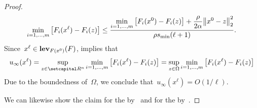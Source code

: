 \documentclass[../../main]{subfiles}
\begin{document}
\begin{proof}
\begin{equation}
        \min_{i = 1, \dots, m} \left[ F_i(x^\ell) - F_i(z) \right] \le \frac{\displaystyle \min_{i = 1, \dots, m} \left[F_i(x^0) - F_i(z)\right] + \frac{\rho}{2 \alpha} \norm*{x^0 - z}_2^2
}{\rho s_{\min} (\ell + 1)} 
    .\end{equation}
    Since~$x^\ell \in \operatorname{\mathbf{lev}}_{F(x^0)}(F)$,  implies that
    \begin{equation}
        u_\infty(x^\ell) = \sup_{z \in \setR^n} \min_{i = 1, \dots, m} \left[ F_i(x^\ell) - F_i(z) \right] = \sup_{z \in \Omega} \min_{i = 1, \dots, m} \left[ F_i(x^\ell) - F_i(z) \right] 
    \end{equation}
    Due to the boundedness of~$\Omega$, we conclude that~$u_\infty(x^\ell) = O(1 / \ell)$.

    We can likewise show the claim for the  by~ and for the  by~.
\end{proof}
\end{document}

